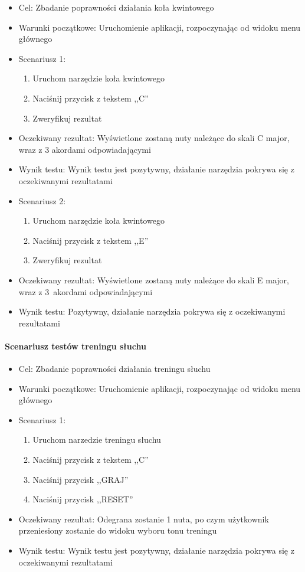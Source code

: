 \begin{itemize}
    \item Cel: Zbadanie poprawności działania koła kwintowego
    \item Warunki początkowe: Uruchomienie aplikacji, rozpoczynając od widoku menu głównego
    \item Scenariusz 1:
        \begin{enumerate}
            \item Uruchom narzędzie koła kwintowego
            \item Naciśnij przycisk z tekstem ,,C''
            \item Zweryfikuj rezultat
        \end{enumerate}
    \item Oczekiwany rezultat: Wyświetlone zostaną nuty należące do skali C major, wraz z 3 akordami odpowiadającymi 
    \item Wynik testu: Wynik testu jest pozytywny, działanie narzędzia pokrywa się z oczekiwanymi rezultatami
    \item Scenariusz 2:
        \begin{enumerate}
            \item Uruchom narzędzie koła kwintowego
            \item Naciśnij przycisk z tekstem ,,E''
            \item Zweryfikuj rezultat
        \end{enumerate}
    \item Oczekiwany rezultat: Wyświetlone zostaną nuty należące do skali E major, wraz z 3~akordami odpowiadającymi 
    \item Wynik testu: Pozytywny, działanie narzędzia pokrywa się z oczekiwanymi rezultatami
\end{itemize}

\paragraph{Scenariusz testów treningu słuchu}

\begin{itemize}
    \item Cel: Zbadanie poprawności działania treningu słuchu
    \item Warunki początkowe: Uruchomienie aplikacji, rozpoczynając od widoku menu głównego
    \item Scenariusz 1:
        \begin{enumerate}
            \item Uruchom narzedzie treningu słuchu
            \item Naciśnij przycisk z tekstem ,,C''
            \item Naciśnij przycisk ,,GRAJ''
            \item Naciśnij przycisk ,,RESET''
        \end{enumerate}
    \item Oczekiwany rezultat: Odegrana zostanie 1 nuta, po czym użytkownik przeniesiony zostanie do widoku wyboru tonu treningu
    \item Wynik testu: Wynik testu jest pozytywny, działanie narzędzia pokrywa się z oczekiwanymi rezultatami
\end{itemize}


